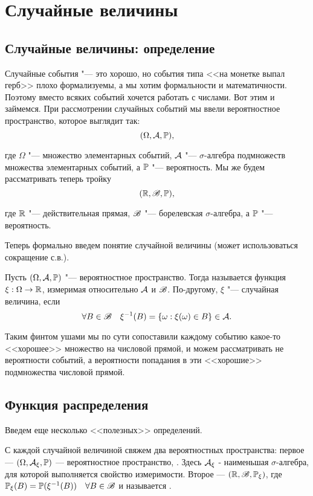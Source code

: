 \documentclass[../TV&MS.tex]{subfiles}
\begin{document}
    
\section{Случайные величины}

\subsection{Случайные величины: определение}

\qquad Случайные события "--- это хорошо, но события типа <<на монетке выпал герб>> плохо формализуемы, 
а мы хотим формальности и математичности. Поэтому вместо всяких событий хочется работать с числами. 
Вот этим и займемся. При рассмотрении случайных событий мы ввели вероятностное пространство, 
которое выглядит так:
$$(\Omega, \mathcal{A}, \mathbb{P}),$$

где $\Omega$ "--- множество элементарных событий, $\mathcal{A}$ "--- $\sigma$-алгебра подмножеств 
множества элементарных событий, а $\mathbb{P}$ "--- вероятность. Мы же будем рассматривать теперь тройку
$$(\mathbb{R}, \mathscr{B}, \mathbb{P}),$$

где $\mathbb{R}$ "--- действительная прямая, $\mathscr{B}$ "--- борелевская $\sigma$-алгебра, а $\mathbb{P}$ "--- вероятность.


Теперь формально введем понятие случайной величины (может использоваться сокращение с.в.).

\begin{Def}
Пусть $(\Omega, \mathcal{A}, \mathbb{P})$ "--- вероятностное пространство. Тогда  
называется функция $\xi : \Omega \to \mathbb{R}$, измеримая относительно $\mathcal{A}$ и $\mathscr{B}$. 
По-другому, $\xi$ "--- случайная величина, если
$$\forall B \in \mathscr{B} \quad \xi^{-1}(B) = \lbrace \omega : \xi(\omega) \in B \rbrace \in \mathcal{A}.$$
\end{Def}

\begin{Wtf}
Таким финтом ушами мы по сути сопоставили каждому событию какое-то <<хорошее>> множество на 
числовой прямой, и можем рассматривать не вероятности событий, а вероятности попадания в эти 
<<хорошие>> подмножества числовой прямой.
\end{Wtf}

\subsection{Функция распределения}

Введем еще несколько <<полезных>> определений.

\begin{Def}
С каждой случайной величиной свяжем два вероятностных пространства: первое --- 
$(\Omega, \mathcal{A}_\xi, \mathbb{P})$ --- вероятностное пространство, . 
Здесь $\mathcal{A}_\xi$ - наименьшая $\sigma$-алгебра, для которой выполняется свойство измеримости. 
Второе --- $(\mathbb{R}, \mathscr{B}, \mathbb{P}_\xi)$, где $\mathbb{P}_\xi(B) = \mathbb{P}(\xi^{-1}(B)) \quad \forall B \in \mathscr{B}$ 
и называется .
\end{Def}
\end{document}
